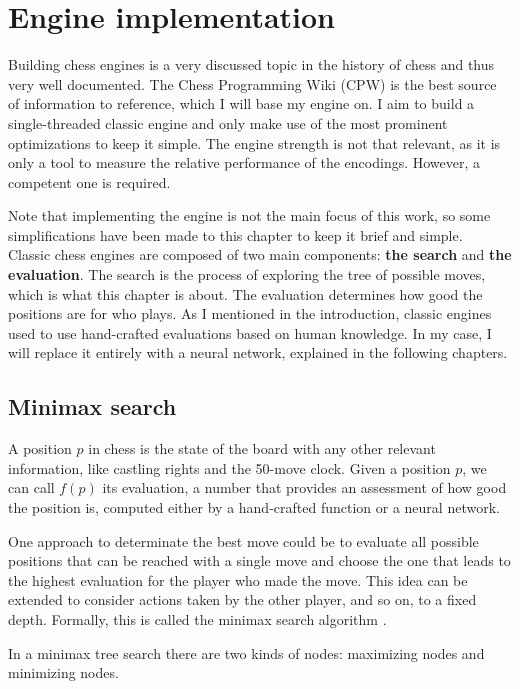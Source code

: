 \section{Engine implementation}

Building chess engines is a very discussed topic in the history of chess and thus very well documented. The Chess Programming Wiki (CPW) \cite{cpw} is the best source of information to reference, which I will base my engine on. I aim to build a single-threaded classic engine and only make use of the most prominent optimizations to keep it simple. The engine strength is not that relevant, as it is only a tool to measure the relative performance of the encodings. However, a competent one is required.

Note that implementing the engine is not the main focus of this work, so some simplifications have been made to this chapter to keep it brief and simple. \\

Classic chess engines are composed of two main components: \textbf{the search} and \textbf{the evaluation}. The search is the process of exploring the tree of possible moves, which is what this chapter is about. The evaluation determines how good the positions are for who plays. As I mentioned in the introduction, classic engines used to use hand-crafted evaluations based on human knowledge. In my case, I will replace it entirely with a neural network, explained in the following chapters.

\subsection{Minimax search}

A position $p$ in chess is the state of the board with any other relevant information, like castling rights and the 50-move clock. Given a position $p$, we can call $f(p)$ its evaluation, a number that provides an assessment of how good the position is, computed either by a hand-crafted function or a neural network.

One approach to determinate the best move could be to evaluate all possible positions that can be reached with a single move and choose the one that leads to the highest evaluation for the player who made the move. This idea can be extended to consider actions taken by the other player, and so on, to a fixed depth. Formally, this is called the minimax search algorithm \cite{minimax-survey:1995}.

In a minimax tree search there are two kinds of nodes: maximizing nodes and minimizing nodes. 

